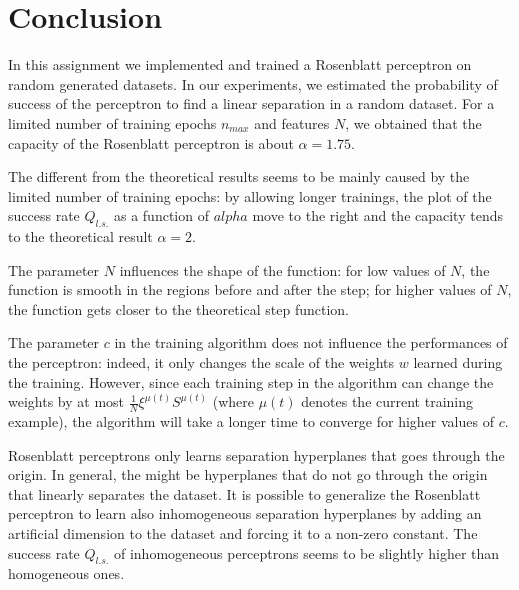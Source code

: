 \section{Conclusion}

In this assignment we implemented and trained a Rosenblatt perceptron on random generated datasets.
In our experiments, we estimated the probability of success of the perceptron to find a linear separation in a random dataset.
For a limited number of training epochs $n_{max}$ and features $N$, we obtained that the capacity of the Rosenblatt perceptron is about $\alpha = 1.75$.

The different from the theoretical results seems to be mainly caused by the limited number of training epochs:
by allowing longer trainings, the plot of the success rate $Q_{l.s.}$ as a function of $alpha$ move to the right and the capacity tends to the theoretical result $\alpha = 2$.

The parameter $N$ influences the shape of the function:
for low values of $N$, the function is smooth in the regions before and after the step;
for higher values of $N$, the function gets closer to the theoretical step function.

The parameter $c$ in the training algorithm does not influence the performances of the perceptron:
indeed, it only changes the scale of the weights $w$ learned during the training.
However, since each training step in the algorithm can change the weights by at most $\frac{1}{N}\xi^{\mu(t)} S^{\mu(t)}$ (where $\mu(t)$ denotes the current training example), the algorithm will take a longer time to converge for higher values of $c$.

Rosenblatt perceptrons only learns separation hyperplanes that goes through the origin.
In general, the might be hyperplanes that do not go through the origin that linearly separates the dataset.
It is possible to generalize the Rosenblatt perceptron to learn also inhomogeneous separation hyperplanes by adding an artificial dimension to the dataset and forcing it to a non-zero constant.
The success rate $Q_{l.s.}$ of inhomogeneous perceptrons seems to be slightly higher than homogeneous ones.
